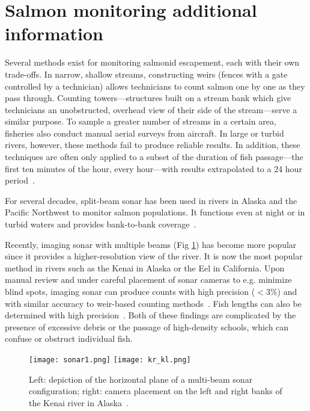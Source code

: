 \clearpage
\setcounter{page}{1}
\maketitlesupplementary


\section{Salmon monitoring additional information}


Several methods exist for monitoring salmonid escapement, each with their own trade-offs. In narrow, shallow streams, constructing weirs (fences with a gate controlled by a technician) allows technicians to count salmon one by one as they pass through. Counting towers---structures built on a stream bank which give technicians an unobstructed, overhead view of their side of the stream---serve a similar purpose. To sample a greater number of streams in a certain area, fisheries also conduct manual aerial surveys from aircraft. In large or turbid rivers, however, these methods fail to produce reliable results. In addition, these techniques are often only applied to a subset of the duration of fish passage---\eg the first ten minutes of the hour, every hour---with results extrapolated to a 24 hour period~\cite{AlaskaNonSonar, Key2017}. 

For several decades, split-beam sonar has been used in rivers in Alaska and the Pacific Northwest to monitor salmon populations. It functions even at night or in turbid waters and provides bank-to-bank coverage~\cite{Key2017}.

Recently, imaging sonar with multiple beams (Fig \ref{fig:sonar}) has become more popular since it provides a higher-resolution view of the river. It is now the most popular method in rivers such as the Kenai in Alaska or the Eel in California. 
Upon manual review and under careful placement of sonar cameras to e.g. minimize blind spots, imaging sonar can produce counts with high precision ($<$3\%) and with similar accuracy to weir-based counting methods~\cite{holmes2006accuracy}. Fish lengths can also be determined with high precision~\cite{COOK201959}. Both of these findings are complicated by the presence of excessive debris or the passage of high-density schools, which can confuse or obstruct individual fish.

\begin{figure}[t]
  \centering
  \texttt{[image: sonar1.png]}
  \texttt{[image: kr\_kl.png]}
  \caption{Left: depiction of the horizontal plane of a multi-beam sonar configuration; right: camera placement on the left and right banks of the Kenai river in Alaska~\cite{Key2017}.
  }
  \label{fig:sonar}
\end{figure}


